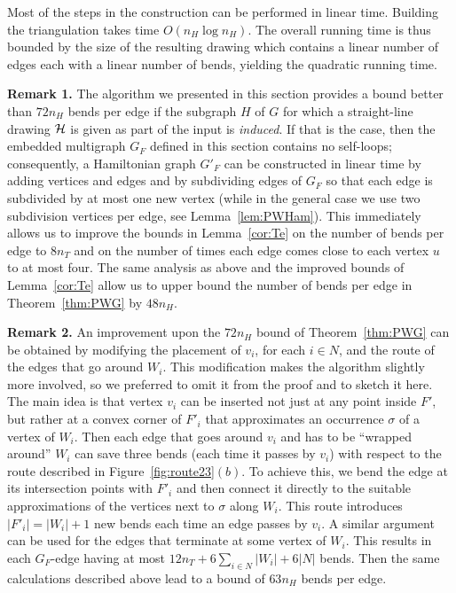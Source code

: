 \documentclass{llncs}
\begin{document}
Most of the steps in the construction can be performed in linear time. Building the triangulation takes time $O(n_H \log n_H)$. The overall running time is thus bounded by the size of the resulting drawing which contains a linear number of edges each with a linear number of bends, yielding the quadratic running time.

{\bf Remark 1.} The algorithm we presented in this section provides a bound better than $72 n_H$ bends per edge if the subgraph $H$ of $G$ for which a straight-line drawing $\cal H$ is given as part of the input is {\em induced}. If that is the case, then the embedded multigraph $G_F$ defined in this section contains no self-loops; consequently, a Hamiltonian graph $G'_F$ can be constructed in linear time by adding vertices and edges and by subdividing edges of $G_F$ so that each edge is subdivided by at most one new vertex (while in the general case we use two subdivision vertices per edge, see Lemma~\ref{lem:PWHam}). This immediately allows us to improve the bounds in Lemma~\ref{cor:Te} on the number of bends per edge to $8 n_T$ and on the number of times each edge comes close to each vertex $u$ to at most four. The same analysis as above and the improved bounds of Lemma~\ref{cor:Te} allow us to upper bound the number of bends per edge in Theorem~\ref{thm:PWG} by $48 n_H$.

{\bf Remark 2.} An improvement upon the $72 n_H$ bound of Theorem~\ref{thm:PWG} can be obtained by modifying the placement of $v_i$, for each $i \in N$, and the route of the edges that go around $W_i$. This modification makes the algorithm slightly more involved, so we preferred to omit it from the proof and to sketch it here. The main idea is that vertex $v_i$ can be inserted not just at any point inside $F'$, but rather at a convex corner of $F'_i$ that approximates an occurrence $\sigma$ of a vertex of $W_i$. Then each edge that goes around $v_i$ and has to be ``wrapped around'' $W_i$ can save three bends (each time it passes by $v_i$) with respect to the route described in Figure~\ref{fig:route23}$(b)$. To achieve this, we bend the edge at its intersection points with $F'_i$ and then connect it directly to the suitable approximations of the vertices next to $\sigma$ along $W_i$. This route introduces $|F'_i|=|W_i| + 1$ new bends each time an edge passes by $v_i$. A similar argument can be used for the edges that terminate at some vertex of $W_i$. This results in each $G_F$-edge having at most $12n_T+6\sum_{i\in N} |W_i| + 6|N|$ bends. Then the same calculations described above lead to a bound of $63n_H$ bends per edge.
\end{document}
